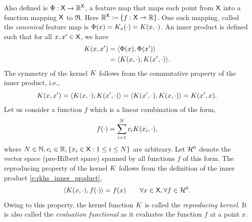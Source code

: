 Also defined is $\Phi: {\sf X} \to \mathbb{R}^{\sf X}$, a feature map that maps each point from ${\sf X}$ into a function mapping ${\sf X}$ to $\Re$. Here $\mathbb{R}^{\sf X} \mathbin{:=} \{f: {\sf X} \to \mathbb{R} \}$. One such mapping, called the \textit{canonical} feature map is $\Phi(x) = K_x(\cdot) =  K(x,\cdot)$. An inner product is defined such that for all $x,x' \in {\sf X}$, we have
\begin{equation}
\begin{aligned}
\Kern(x,x') &= \langle \featuremap(x), \featuremap(x')\rangle \\
& = \langle \Kern(x,\cdot), \Kern(x',\cdot)\rangle.
\end{aligned}
\label{e:rkhs_inner_product}
\end{equation}
The symmetry of the kernel $K$ follows from the commutative property of the inner product, i.e.,
\begin{equation}
K(x,x') = \langle K(x, \cdot), K(x',\cdot) \rangle = \langle K(x',\cdot), K(x,\cdot) \rangle = K(x', x). 
\end{equation}
Let us consider a function $f$ which is a linear combination of the form,
\begin{equation}
f(\cdot) = \sum_{i=1}^N c_i \Kern(x_i, \cdot),
\label{e:f_rkhs}
\end{equation}
where $N \in \mathbb{N}, c_i \in \mathbb{R}, \{ x_i \in {\sf X}: 1\leq i \leq N \}$ are arbitrary. Let ${\cal H}^0$ denote the vector space (pre-Hilbert space) spanned by all functions $f$ of this form. 
The reproducing property of the kernel $K$ follows from the definition of the inner product \eqref{e:rkhs_inner_product},
\begin{equation}
\langle K(x,\cdot), f(\cdot)\rangle = f(x) \qquad \forall x \in {\sf X}, \forall f \in {\cal H}^0.
\end{equation}
Owing to this property, the kernel function $K$ is called the \textit{reproducing kernel}. It is also called the \textit{evaluation functional} as it evaluates the function $f$ at a point $x$. 

